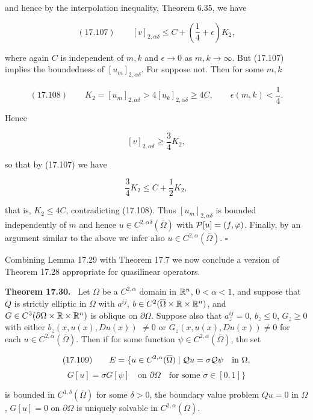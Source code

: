 and hence by the interpolation inequality, Theorem 6.35, we have

\[
(17.107)\qquad [v]_{2,\alpha\delta} \le C + \left(\frac14 + \epsilon\right)K_2,
\]

where again $C$ is independent of $m,k$ and $\epsilon \to 0$ as $m,k \to \infty$. But (17.107) implies
the boundedness of $[u_m]_{2,\alpha\delta}$. For suppose not. Then for some $m,k$

\[
(17.108)\qquad K_2 = [u_m]_{2,\alpha\delta} > 4[u_k]_{2,\alpha\delta} \ge 4C,\qquad \epsilon(m,k) < \frac14.
\]

Hence

\[
[v]_{2,\alpha\delta} \ge \frac34 K_2,
\]

so that by (17.107) we have

\[
\frac34 K_2 \le C + \frac12 K_2,
\]

that is, $K_2 \le 4C$, contradicting (17.108). Thus $[u_m]_{2,\alpha\delta}$ is bounded independently of
$m$ and hence $u \in C^{2,\alpha\delta}(\overline{\Omega})$ with $\mathcal{P}[u] = (f,\varphi)$. Finally, by an argument similar to
the above we infer also $u \in C^{2,\alpha}(\overline{\Omega})$. $\square$

Combining Lemma 17.29 with Theorem 17.7 we now conclude a version of
Theorem 17.28 appropriate for quasilinear operators.

\textbf{Theorem 17.30.} \ Let $\Omega$ be a $C^{2,\alpha}$ domain in $\mathbb{R}^n$, $0 < \alpha < 1$, and suppose that $Q$ is
strictly elliptic in $\Omega$ with $a^{ij}$, $b \in C^2(\overline{\Omega}\times \mathbb{R} \times \mathbb{R}^n)$, and $G \in C^3(\partial\Omega \times \mathbb{R} \times \mathbb{R}^n)$ is
oblique on $\partial\Omega$. Suppose also that $a^{ij}_z=0$, $b_z \le 0$, $G_z \ge 0$ with either $b_z(x,u(x),Du(x))$
$\neq 0$ or $G_z(x,u(x),Du(x)) \neq 0$ for each $u \in C^{2,\alpha}(\overline{\Omega})$. Then if for some function $\psi \in
C^{2,\alpha}(\overline{\Omega})$, the set

\[
(17.109)\qquad E = \{u \in C^{2,\alpha}(\overline{\Omega}) \mid \mathcal{Q} u = \sigma \mathcal{Q}\psi \quad \text{in } \Omega,
\]
\[
G[u] = \sigma G[\psi] \quad \text{on } \partial\Omega \quad \text{for some } \sigma \in [0,1]\}
\]


is bounded in $C^{1,\delta}(\overline{\Omega})$ for some $\delta > 0$, the boundary value problem $Qu = 0$ in $\Omega$, $G[u] = 0$ on $\partial \Omega$ is uniquely solvable in $C^{2,\alpha}(\overline{\Omega})$.

